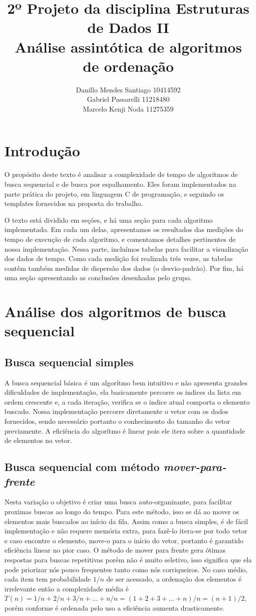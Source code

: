 \documentclass{article}
\title{%
    2º Projeto da disciplina Estruturas de Dados II \\
     \large Análise assintótica de algoritmos de ordenação}
\author{Danillo Mendes Santiago 10414592\\Gabriel Passarelli 11218480\\ Marcelo Kenji Noda 11275359}
\begin{document}
%
\maketitle
%
\section{Introdução}
O propósito deste texto é analisar a complexidade de tempo de algoritmos de busca sequencial e de busca por espalhamento. Eles foram implementados na parte prática do projeto, em linguagem C de programação, e seguindo os templates fornecidos na proposta do trabalho.\par
%
O texto está dividido em seções, e há uma seção para cada algoritmo implementado. Em cada um delas, apresentamos os resultados das medições do tempo de execução de cada algoritmo, e comentamos detalhes pertinentes de nossa implementação. Nessa parte, incluímos tabelas para facilitar a visualização dos dados de tempo. Como cada medição foi realizada três vezes, as tabelas contêm também medidas de dispersão dos dados (o desvio-padrão). Por fim, há uma seção apresentando as conclusões desenhadas pelo grupo.
%
\section{Análise dos algoritmos de busca sequencial}
\subsection{Busca sequencial simples}
%
A busca sequencial básica é um algorítmo bem intuitivo e não apresenta grandes dificuldades de implementação, ela basicamente percorre os indices da lista em ordem crescente e, a cada iteração, verifica se o indice atual comporta o elemento buscado. Nossa implementação percorre diretamente o vetor com os dados fornecidos, sendo necessário portanto o conhecimento do tamanho do vetor previamente.
A eficiência do algorítmo é linear pois ele itera sobre a quantidade de elementos no vetor.
%
\subsection{Busca sequencial com método \textit{mover-para-frente}}
%
Nesta variação o objetivo é criar uma busca auto-organizante, para facilitar proximas buscas ao longo do tempo. Para este método, isso se dá ao mover os elementos mais buscados ao início da fila.
Assim como a busca simples, é de fácil implementação e não requere memória extra, para fazê-lo itera-se por todo vetor e caso encontre o elemento, move-o para o início do vetor, portanto é garantido eficiência linear no pior caso.
O método de mover para frente gera ótimas respostas para buscas repetitivas porém não é muito seletivo, isso significa que ela pode priorizar nós pouco frequentes tanto como nós corriqueiros.
No caso médio, cada item tem probabilidade $1/n$ de ser acessado, a ordenação dos elementos é irrelevante então a complexidade média é $T(n) = 1/n + 2/n + 3/n + ... + n/n = (1 + 2 + 3 + ... + n)/n = (n+1)/2$, porém conforme é ordenada pelo uso a eficiência aumenta drasticamente.
%
\end{document}
